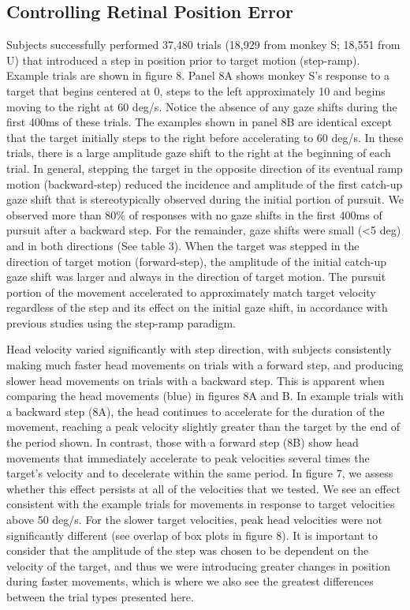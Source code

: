 \documentclass[12pt]{article}
\begin{document}
\subsection{Controlling Retinal Position Error}
Subjects successfully performed 37,480 trials (18,929 from monkey S; 18,551 from U) that introduced a step in position prior to target motion (step-ramp). Example trials are shown in figure 8. Panel 8A shows monkey S’s response to a target that begins centered at 0\textdegree{}, steps to the left approximately 10\textdegree{} and begins moving to the right at 60 deg/s. Notice the absence of any gaze shifts during the first 400ms of these trials. The examples shown in panel 8B are identical except that the target initially steps to the right before accelerating to 60 deg/s. In these trials, there is a large amplitude gaze shift to the right at the beginning of each trial. In general, stepping the target in the opposite direction of its eventual ramp motion (backward-step) reduced the incidence and amplitude of the first catch-up gaze shift that is stereotypically observed during the initial portion of pursuit. We observed more than 80\% of responses with no gaze shifts in the first 400ms of pursuit after a backward step. For the remainder, gaze shifts were small (<5 deg) and in both directions (See table 3). When the target was stepped in the direction of target motion (forward-step), the amplitude of the initial catch-up gaze shift was larger and always in the direction of target motion. The pursuit portion of the movement accelerated to approximately match target velocity regardless of the step and its effect on the initial gaze shift, in accordance with previous studies using the step-ramp paradigm. 

Head velocity varied significantly with step direction, with subjects consistently making much faster head movements on trials with a forward step, and producing slower head movements on trials with a backward step. This is apparent when comparing the head movements (blue) in figures 8A and B. In example trials with a backward step (8A), the head continues to accelerate for the duration of the movement, reaching a peak velocity slightly greater than the target by the end of the period shown. In contrast, those with a forward step (8B) show head movements that immediately accelerate to peak velocities several times the target’s velocity and to decelerate within the same period.  In figure 7, we assess whether this effect persists at all of the velocities that we tested. We see an effect consistent with the example trials for movements in response to target velocities above 50 deg/s. For the slower target velocities, peak head velocities were not significantly different (see overlap of box plots in figure 8). It is important to consider that the amplitude of the step was chosen to be dependent on the velocity of the target, and thus we were introducing greater changes in position during faster movements, which is where we also see the greatest differences between the trial types presented here.
\end{document}
